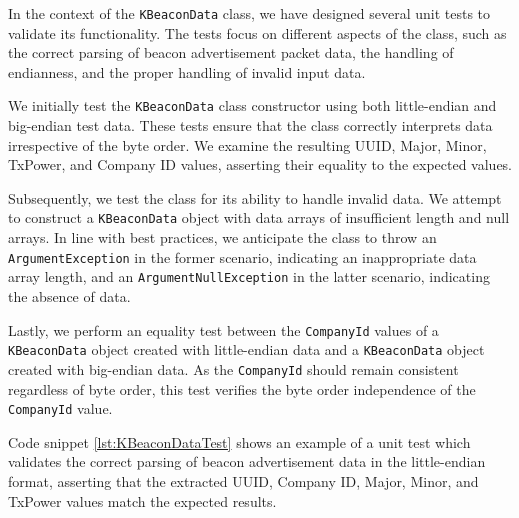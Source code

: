 In the context of the \texttt{KBeaconData} class, we have designed several unit tests to validate its functionality. The tests focus on different aspects of the class, such as the correct parsing of beacon advertisement packet data, the handling of endianness, and the proper handling of invalid input data. 

We initially test the \texttt{KBeaconData} class constructor using both little-endian and big-endian test data. These tests ensure that the class correctly interprets data irrespective of the byte order. We examine the resulting UUID, Major, Minor, TxPower, and Company ID values, asserting their equality to the expected values.

Subsequently, we test the class for its ability to handle invalid data. We attempt to construct a \texttt{KBeaconData} object with data arrays of insufficient length and null arrays. In line with best practices, we anticipate the class to throw an \texttt{ArgumentException} in the former scenario, indicating an inappropriate data array length, and an \texttt{ArgumentNullException} in the latter scenario, indicating the absence of data.

Lastly, we perform an equality test between the \texttt{CompanyId} values of a \\\texttt{KBeaconData} object created with little-endian data and a \texttt{KBeaconData} object created with big-endian data. As the \texttt{CompanyId} should remain consistent regardless of byte order, this test verifies the byte order independence of the \texttt{CompanyId} value.

Code snippet \ref{lst:KBeaconDataTest} shows an example of a unit test which validates the correct parsing of beacon advertisement data in the little-endian format, asserting that the extracted UUID, Company ID, Major, Minor, and TxPower values match the expected results.

